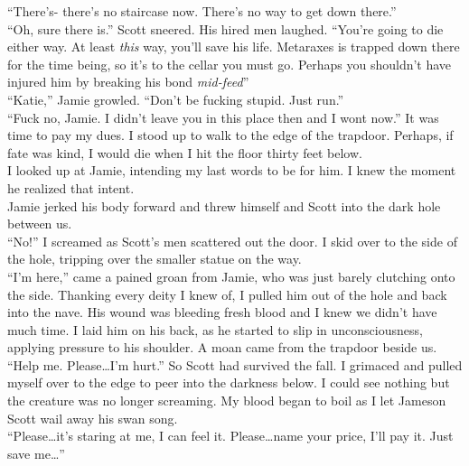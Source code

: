\documentclass[a5paper]{scrartcl}
\begin{document}
\enquote{There's- there's no staircase now. There's no way to get down there.}\\


\enquote{Oh, sure there is.} Scott sneered. His hired men laughed. \enquote{You're going to die either way. At least \textit{this}
 way, you'll save his life. Metaraxes is trapped down there for the time being, so it's to the cellar you must go. Perhaps you shouldn't have injured him by breaking his bond \textit{mid-feed}}\\


\enquote{Katie,} Jamie growled. \enquote{Don't be fucking stupid. Just run.}\\


\enquote{Fuck no, Jamie. I didn't leave you in this place then and I wont now.} It was time to pay my dues. I stood up to walk to the edge of the trapdoor. Perhaps, if fate was kind, I would die when I hit the floor thirty feet below. \\


I looked up at Jamie, intending my last words to be for him. I knew the moment he realized that intent. \\


Jamie jerked his body forward and threw himself and Scott into the dark hole between us.\\


\enquote{No!} I screamed as Scott's men scattered out the door. I skid over to the side of the hole, tripping over the smaller statue on the way.\\


\enquote{I'm here,} came a pained groan from Jamie, who was just barely clutching onto the side. Thanking every deity I knew of, I pulled him out of the hole and back into the nave. His wound was bleeding fresh blood and I knew we didn't have much time. I laid him on his back, as he started to slip in unconsciousness, applying pressure to his shoulder. A moan came from the trapdoor beside us.\\


\enquote{Help me. Please\dots  I'm hurt.} So Scott had survived the fall. I grimaced and pulled myself over to the edge to peer into the darkness below. I could see nothing but the creature was no longer screaming. My blood began to boil as I let Jameson Scott wail away his swan song. \\


\enquote{Please\dots it's staring at me, I can feel it. Please\dots name your price, I'll pay it. Just save me\dots }\\
\end{document}
